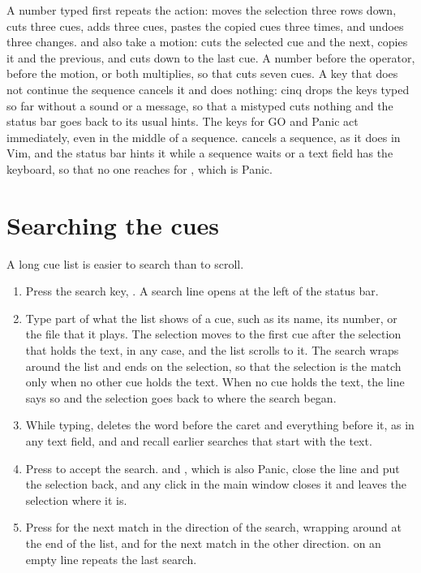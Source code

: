 A number typed first repeats the action:  moves the selection three
rows down, \key{3dd} cuts three cues,  adds three cues, 
pastes the copied cues three times, and  undoes three changes.
 and  also take a motion:  cuts the selected cue and
the next,  copies it and the previous, and  cuts down to the
last cue.  A number before the operator, before the motion, or both
multiplies, so that  cuts seven cues.  A key that does not
continue the sequence cancels it and does nothing: cinq drops the keys typed
so far without a sound or a message, so that a mistyped  cuts nothing
and the status bar goes back to its usual hints.  The keys for GO and Panic
act immediately, even in the middle of a sequence.   cancels a
sequence, as it does in Vim, and the status bar hints it while a sequence
waits or a text field has the keyboard, so that no one reaches for
, which is Panic.

\section{Searching the cues}

A long cue list is easier to search than to scroll.

\begin{enumerate}
\item Press the search key, \key{/}.  A search line opens at the left of
  the status bar.
\item Type part of what the list shows of a cue, such as its name, its number,
  or the file that it plays.  The selection moves to the first cue after the
  selection that holds the text, in any case, and the list scrolls to it.  The
  search wraps around the list and ends on the selection, so that the
  selection is the match only when no other cue holds the text.  When no cue
  holds the text, the line says so and the selection goes back to where the
  search began.
\item While typing,  deletes the word before the caret and
   everything before it, as in any text field, and
   and  recall earlier searches that start with
  the text.
\item Press  to accept the search.   and
  , which is also Panic, close the line and put the selection
  back, and any click in the main window closes it and leaves the selection
  where it is.
\item Press  for the next match in the direction of the search, wrapping
  around at the end of the list, and  for the next match in the other
  direction.   on an empty line repeats the last search.
\end{enumerate}

